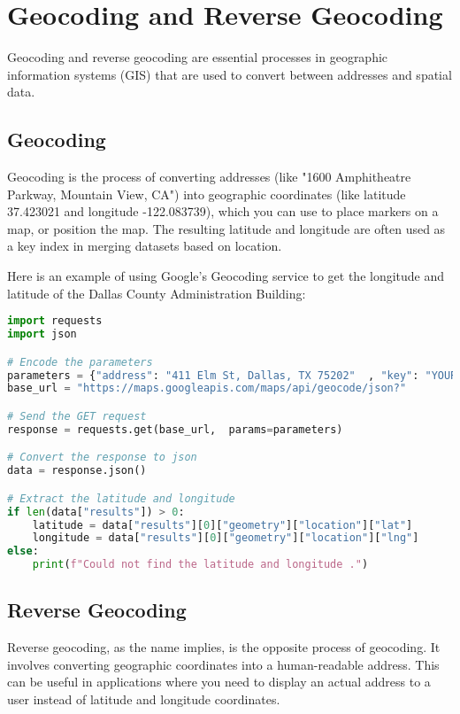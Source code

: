 \chapter{Geocoding and Reverse Geocoding}

Geocoding and reverse geocoding are essential processes in geographic
information systems (GIS) that are used to convert between addresses
and spatial data.

\section{Geocoding}

Geocoding is the process of converting addresses (like "1600
Amphitheatre Parkway, Mountain View, CA") into geographic coordinates
(like latitude 37.423021 and longitude -122.083739), which you can use
to place markers on a map, or position the map. The resulting latitude
and longitude are often used as a key index in merging datasets based
on location.

Here is an example of using Google's Geocoding service to get the
longitude and latitude of the Dallas County Administration Building:

\begin{lstlisting}[language=Python]
import requests
import json

# Encode the parameters
parameters = {"address": "411 Elm St, Dallas, TX 75202"  , "key": "YOUR_API_KEY"}
base_url = "https://maps.googleapis.com/maps/api/geocode/json?"

# Send the GET request
response = requests.get(base_url,  params=parameters)

# Convert the response to json
data = response.json()

# Extract the latitude and longitude
if len(data["results"]) > 0:
    latitude = data["results"][0]["geometry"]["location"]["lat"]
    longitude = data["results"][0]["geometry"]["location"]["lng"]
else:
    print(f"Could not find the latitude and longitude .")
\end{lstlisting}

\section{Reverse Geocoding}

Reverse geocoding, as the name implies, is the opposite process of
geocoding. It involves converting geographic coordinates into a
human-readable address. This can be useful in applications where you
need to display an actual address to a user instead of latitude and
longitude coordinates.

